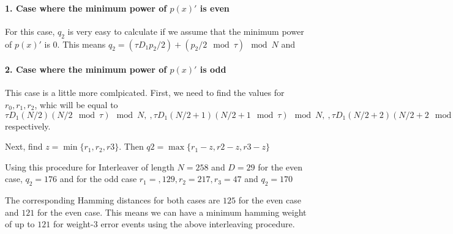 \documentclass[11pt, oneside, dvipdfmx]{book}
\begin{document}
\paragraph{1. Case where the minimum power of $p(x)'$ is even}
For this case, $q_2$ is very easy to calculate if we assume that the minimum power of $p(x)'$ is $0$. This means $q_2=(\tau D_1p_2/2) +(p_2/2 \mod \tau) \mod N$ and  
 
 \paragraph{2. Case where the minimum power of $p(x)'$ is odd}
 This case is a little more comlpicated. First, we need to find the values for $r_0,r_1,r_2$, whic will be equal to $\tau D_1(N/2) (N/2 \mod \tau) \mod N,~,\tau D_1(N/2+1) (N/2 +1 \mod \tau) \mod N,~,\tau D_1(N/2 +2) (N/2 +2\mod \tau) \mod N$ respectively.
 
 Next, find $z=\min \{r_1,r_2,r3\}$. Then $q2=\max\{r_1-z,r2-z,r3-z\}$
 
 
 Using this procedure for Interleaver of length $N=258$ and $D=29$ for the even case, $q_2=176$ and for the odd case $r_1=,129,r_2=217,r_3=47$ and $q_2 = 170$
 
 The corresponding Hamming distances for both cases are $125$ for the even case and $121$ for the even case. This means we can have a minimum hamming weight of up to $121$ for weight-$3$ error events using the above interleaving procedure. 
 

 
 
 
\end{document}
